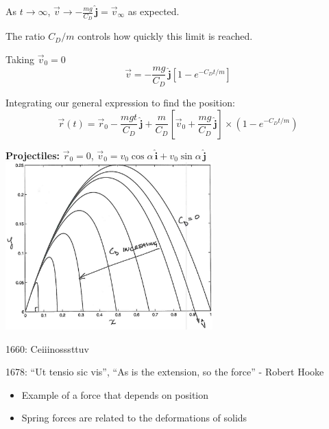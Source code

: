 \documentclass[twoside]{scrartcl}
\let\oldhat\hat
\renewcommand{\hat}[1]{\,\oldhat{\boldsymbol{\mathbf{#1}}}}
\begin{document}
\begin{example}
As $t \to \infty$, $\vec{v} \to -\frac{mg}{C_D}\hat{j} = \vec{v}_{\infty}$ as expected.

The ratio $C_D/m$ controls how quickly this limit is reached. 

Taking $\vec{v}_0 = 0$
\[\vec{v} = -\frac{mg}{C_D}\hat{j}[1 - e^{-C_Dt/m}]\]
\begin{center}
	
\end{center}


Integrating our general expression to find the position:
\[\vec{r}(t) = \vec{r}_0 - \frac{mgt}{C_D}\hat{j} + \frac{m}{C_D}[\vec{v}_0 + \frac{mg}{C_D}\hat{j}]\times(1-e^{-C_Dt/m})\]
\end{example}


\textbf{Projectiles:} $\vec{r}_0 = 0$, $\vec{v}_0 = v_0\cos\alpha\hat{i} + v_0\sin\alpha\hat{j}$\\[0.5cm]
\hspace*{2cm}\includegraphics[width=8cm]{drag.jpg}




1660: Ceiiinosssttuv 

1678: ``Ut tensio sic vis'', ``As is the extension, so the force'' - Robert Hooke


\begin{itemize}
  \item Example of a force that depends on position
  \item Spring forces are related to the deformations of solids
\end{itemize}
\end{document}
